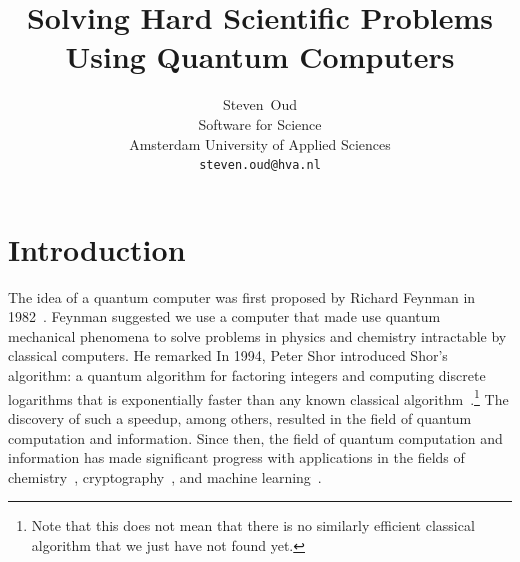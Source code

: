 \documentclass[twocolumn, switch]{article}
\title{Solving Hard Scientific Problems Using Quantum Computers}
\author{
  Steven~Oud \\
  Software for Science \\
  Amsterdam University of Applied Sciences\\
  \texttt{steven.oud@hva.nl} \\
}
\begin{document}
    

    \section{Introduction}
    The idea of a quantum computer was first proposed by Richard Feynman in 1982~\cite{feynman-simulating}.
    Feynman suggested we use a computer that made use quantum mechanical phenomena to solve problems in physics and chemistry intractable by classical computers.
    He remarked 
    In 1994, Peter Shor introduced Shor's algorithm: a quantum algorithm for factoring integers and computing discrete logarithms that is exponentially faster than any known classical algorithm~\cite{shor-factoring}.\footnote{Note that this does not mean that there is no similarly efficient classical algorithm that we just have not found yet.}
    The discovery of such a speedup, among others, resulted in the field of quantum computation and information.
    Since then, the field of quantum computation and information has made significant progress with applications in the fields of chemistry~\cite{mcardle2018quantum}, cryptography~\cite{bennett2014quantum}, and machine learning~\cite{oud2019simulation}.
    
\end{document}
